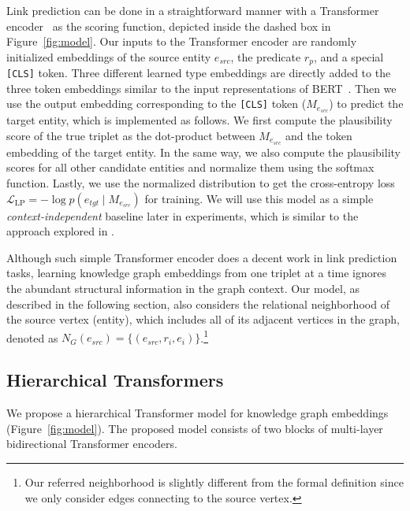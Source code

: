 \documentclass[11pt]{article}
\begin{document}
Link prediction can be done in a straightforward manner with a Transformer encoder~\cite{vaswani2017attention} as the scoring function, depicted inside the dashed box in Figure~\ref{fig:model}.
Our inputs to the Transformer encoder are randomly initialized embeddings of the source entity $e_{\mathit{src}}$, the predicate $r_p$, and a special \texttt{[CLS]} token.
Three different learned type embeddings are directly added to the three token embeddings similar to the input representations of BERT~\cite{devlin-etal-2019-bert}.
Then we use the output embedding corresponding to the \texttt{[CLS]} token ($M_{e_{\mathit{src}}}$) to predict the target entity, which is implemented as follows.
We first compute the plausibility score of the true triplet as the dot-product between $M_{e_{\mathit{src}}}$ and the token embedding of the target entity.
In the same way, we also compute the plausibility scores for all other candidate entities and normalize them using the softmax function. 
Lastly, we use the normalized distribution to get the cross-entropy loss $\mathcal{L}_{\text{LP}}=-\log p(e_{\mathit{tgt}} \mid M_{e_{\mathit{src}}})$ for training.
We will use this model as a simple \emph{context-independent} baseline later in experiments, which is similar to the approach explored in \citet{wang2019coke}.

Although such simple Transformer encoder does a decent work in link prediction tasks, learning knowledge graph embeddings from one triplet at a time ignores the abundant structural information in the graph context. Our model, as described in the following section, also considers the relational neighborhood of the source vertex (entity), which includes all of its adjacent vertices in the graph, denoted as $N_{G}(e_{\mathit{src}}) = \{(e_{\mathit{src}}, r_i, e_i)\}$.\footnote{Our referred neighborhood is slightly different from the formal definition since we only consider edges connecting to the source vertex.}

\subsection{Hierarchical Transformers} \label{sec:htrme}

We propose a hierarchical Transformer model for knowledge graph embeddings (Figure~\ref{fig:model}). The proposed model consists of two blocks of multi-layer bidirectional Transformer encoders. 
\end{document}

